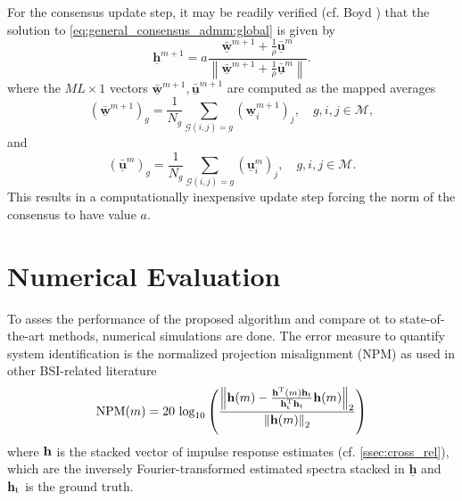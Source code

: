 \documentclass{article}
\newcommand{\h}{\mtxb{h}}
\newcommand{\hf}{\underline{\bm{h}}}
\newcommand{\wf}{\underline{\bm{w}}}
\newcommand{\uuf}{\underline{\bm{u}}}
\newcommand{\Mset}{\mathcal{M}}
\begin{document}
For the consensus update step, it may be readily verified (cf. Boyd \cite{}) that the solution to \eqref{eq:general_consensus_admm:global} is given by
\begin{equation}
    \hf^{m+1} = a\frac{\bar{\wf}^{m+1} + \frac{1}{\rho} \bar{\uuf}^{m} }{\left\| \bar{\wf}^{m+1} + \frac{1}{\rho} \bar{\uuf}^{m} \right\|}.\label{eq:online_admm:consensus_update}
\end{equation}
where the \(M L \times 1\) vectors \(\bar{\wf}^{m+1}, \bar{\uuf}^{m+1}\) are computed as the mapped averages
\begin{equation}
    (\bar{\wf}^{m+1})_g = \frac{1}{N_g} \sum_{\mathcal{G}(i,j)=g} (\wf_i^{m+1})_j,\quad g,i,j \in \Mset,
\end{equation}
and
\begin{equation}
    (\bar{\uuf}^{m})_g = \frac{1}{N_g} \sum_{\mathcal{G}(i,j)=g} (\uuf_i^{m})_j,\quad g,i,j \in \Mset.
\end{equation}
This results in a computationally inexpensive update step forcing the norm of the consensus to have value \(a\).


\section{Numerical Evaluation}
\label{sec:perf_eval}

To asses the performance of the proposed algorithm and compare ot to state-of-the-art methods, numerical simulations are done.
The error measure to quantify system identification is the normalized projection misalignment (NPM) as used in other BSI-related literature \cite{}
\begin{equation}
    \text{NPM}(m) = 20\,\log_{10} \left(\frac{\left\| \h(m) - \frac{\h^\T (m) \h_{\text{t}}}{\h_{\text{t}}^\T \h_{\text{t}}}\h(m) \right\|_2}{\left\|\h(m)\right\|_2} \right)
\end{equation}
where \(\h\) is the stacked vector of impulse response estimates (cf. \autoref{ssec:cross_rel}), which are the inversely Fourier-transformed estimated spectra stacked in \(\hf\) and \(\h_{\text{t}}\) is the ground truth.
\end{document}
